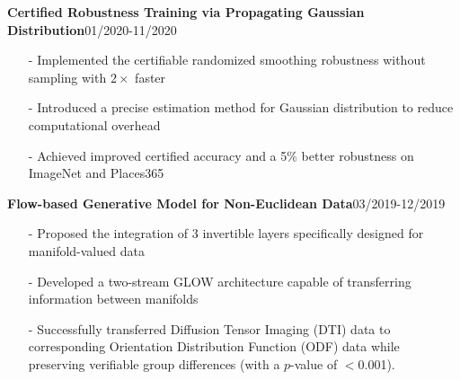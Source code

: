 \documentclass[margin]{res}
\begin{document}
\begin{resume}
                 \vspace{-1em} 
                \textbf{Certified Robustness Training via Propagating Gaussian Distribution}\hfill 01/2020-11/2020
                \begin{itemize}\itemsep -2.2pt %
                 \item[-] Implemented the certifiable randomized smoothing robustness without sampling with $2\times$ faster
                 \item[-] Introduced a precise estimation method for Gaussian distribution to reduce computational overhead
                 \item[-] Achieved improved certified accuracy and a 5\% better robustness on ImageNet and Places365
                 \end{itemize}

                 \vspace{-1em}  

                \textbf{Flow-based Generative Model for Non-Euclidean Data}\hfill 03/2019-12/2019
                \begin{itemize}\itemsep -2.2pt %
                 \item[-] Proposed the integration of 3 invertible layers specifically designed for manifold-valued data
                 \item[-] Developed a two-stream GLOW architecture capable of transferring information between manifolds
                 \item[-] Successfully transferred Diffusion Tensor Imaging (DTI) data to corresponding Orientation Distribution Function (ODF) data while preserving verifiable group differences (with a $p$-value of $<$0.001).
                 \end{itemize}

                 \vspace{-1em}  


\end{resume}
\end{document}

